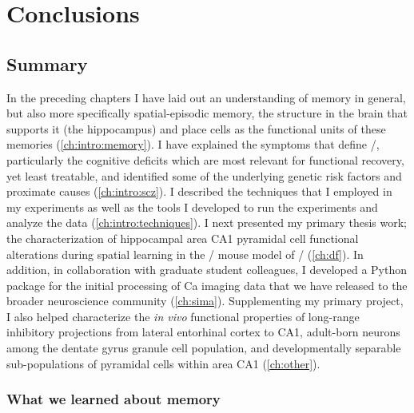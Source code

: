 \acresetall
\chapter{Conclusions}
\label{ch:conclusions}

\section{Summary}
In the preceding chapters I have laid out an understanding of memory in general, but also more specifically spatial-episodic memory, the structure in the brain that supports it (the hippocampus) and place cells as the functional units of these memories (\autoref{ch:intro:memory}).
I have explained the symptoms that define \scz/, particularly the cognitive deficits which are most relevant for functional recovery, yet least treatable, and identified some of the underlying genetic risk factors and proximate causes (\autoref{ch:intro:scz}).
I described the techniques that I employed in my experiments as well as the tools I developed to run the experiments and analyze the data (\autoref{ch:intro:techniques}).
I next presented my primary thesis work; the characterization of hippocampal area CA1 pyramidal cell functional alterations during spatial learning in the \df/ mouse model of \scz/ (\autoref{ch:df}).
In addition, in collaboration with graduate student colleagues, I developed a Python package for the initial processing of Ca imaging data that we have released to the broader neuroscience community (\autoref{ch:sima}).
Supplementing my primary project, I also helped characterize the \emph{in vivo} functional properties of long-range inhibitory projections from lateral entorhinal cortex to CA1, adult-born neurons among the dentate gyrus granule cell population, and developmentally separable sub-populations of pyramidal cells within area CA1 (\autoref{ch:other}).

\subsection{What we learned about memory}

